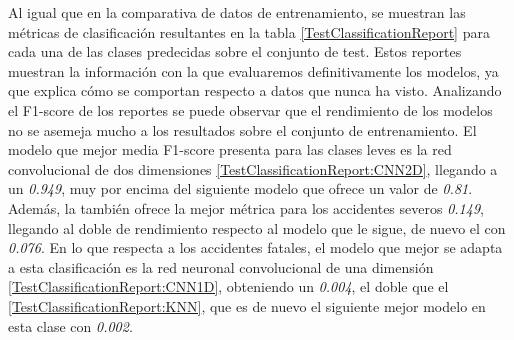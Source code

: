     Al igual que en la comparativa de datos de entrenamiento, se muestran las métricas de clasificación resultantes en la tabla \eqref{TestClassificationReport} para cada una de las clases predecidas sobre el  conjunto de test. Estos reportes muestran la información con la que evaluaremos definitivamente los modelos, ya que explica cómo se comportan respecto a datos que nunca ha visto. Analizando el F1-score de los reportes se puede observar que el rendimiento de los modelos no se asemeja mucho a los resultados sobre el conjunto de entrenamiento. El modelo que mejor media F1-score presenta para las clases leves es la red convolucional de dos dimensiones \eqref{TestClassificationReport:CNN2D}, llegando a un \textit{0.949}, muy por encima del siguiente modelo  que ofrece un valor de \textit{0.81}. Además, la  también ofrece la mejor métrica para los accidentes severos \textit{0.149}, llegando al doble de rendimiento respecto al modelo que le sigue, de nuevo el  con \textit{0.076}. En lo que respecta a los accidentes fatales, el modelo que mejor se adapta a esta clasificación es la red neuronal convolucional de una dimensión \eqref{TestClassificationReport:CNN1D}, obteniendo un \textit{0.004}, el doble que el  \eqref{TestClassificationReport:KNN}, que es de nuevo el siguiente mejor modelo en esta clase con \textit{0.002}.


